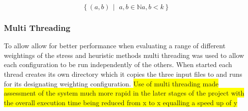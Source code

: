 \[ \left\{ (a, b) \,\middle|\, \, a,b \in \mathbb{N} a,b < k \right\} \]


\subsubsection{Multi Threading}
To allow allow for better performance when evaluating a range of different weightings of the stress and heuristic methods multi threading was used to allow each configuration to be run independently of the others. When started each thread creates its own directory which it copies the three input files to and runs for its designating weighting configuration. \colorbox{yellow}
{Use of multi threading made assessment of the system much more rapid in the later stages of the project with the overall execution time being reduced from x to x equalling a speed up of y}
